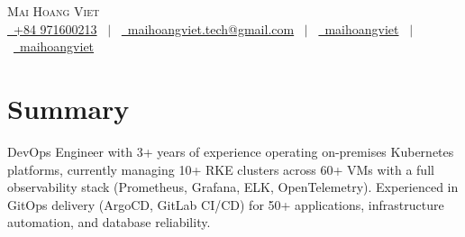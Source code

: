 \documentclass[letterpaper,11pt]{article}
\newcommand{\resumeSubHeadingListStart}{\begin{itemize}[leftmargin=0.15in, label={}]}
\newcommand{\resumeSubHeadingListEnd}{\end{itemize}}
\begin{document}

\begin{center}
    {\Huge \scshape Mai Hoang Viet} \\ \vspace{3pt}
    \small
    \href{tel:+840971600213}{\raisebox{-0.05\height}\faMobile \ +84 971600213} \ $|$ \ 
    \href{mailto:maihoangviet.tech@gmail.com}{\raisebox{-0.05\height}\faEnvelope \ maihoangviet.tech@gmail.com} \ $|$ \ 
    \href{https://www.linkedin.com/in/maihoangviet}{\raisebox{-0.05\height}\faLinkedin\ maihoangviet} \ $|$ \ 
    \href{https://medium.com/@maihoangviet}{\raisebox{-0.05\height}\faMedium\ maihoangviet} \\
\end{center}


\section{Summary}
\vspace{3pt}
\resumeSubHeadingListStart
    \small{\item{
      DevOps Engineer with 3+ years of experience operating on-premises Kubernetes platforms, currently managing 10+ RKE clusters across 60+ VMs with a full observability stack (Prometheus, Grafana, ELK, OpenTelemetry). Experienced in GitOps delivery (ArgoCD, GitLab CI/CD) for 50+ applications, infrastructure automation, and database reliability.
    }}
\resumeSubHeadingListEnd

\end{document}
